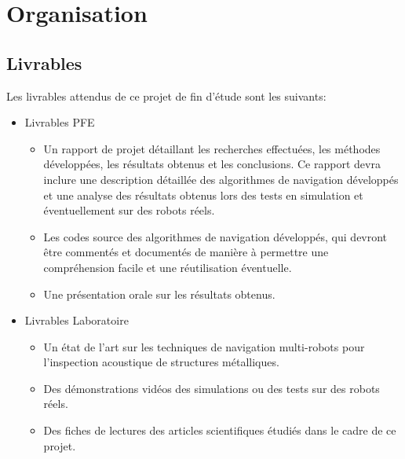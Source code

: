 \documentclass[init,francais,RandD]{rapportPFE}  %
\begin{document}
	\section{Organisation}
		\subsection{Livrables}
			Les livrables attendus de ce projet de fin d'étude sont les suivants:
			\begin{itemize}
				\item Livrables PFE
				\begin{itemize}
					\item Un rapport de projet détaillant les recherches effectuées, les méthodes développées, les résultats obtenus et les conclusions. Ce rapport devra inclure une description détaillée des algorithmes de navigation développés et une analyse des résultats obtenus lors des tests en simulation et éventuellement sur des robots réels.
					\item Les codes source des algorithmes de navigation développés, qui devront être commentés et documentés de manière à permettre une compréhension facile et une réutilisation éventuelle.
					\item Une présentation orale sur les résultats obtenus.
				\end{itemize}
				\item Livrables Laboratoire
				\begin{itemize}
					\item Un état de l'art sur les techniques de navigation multi-robots pour l'inspection acoustique de structures métalliques.
					\item Des démonstrations vidéos des simulations ou des tests sur des robots réels.
					\item Des fiches de lectures des articles scientifiques étudiés dans le cadre de ce projet.
				\end{itemize}
			\end{itemize}
\end{document}
